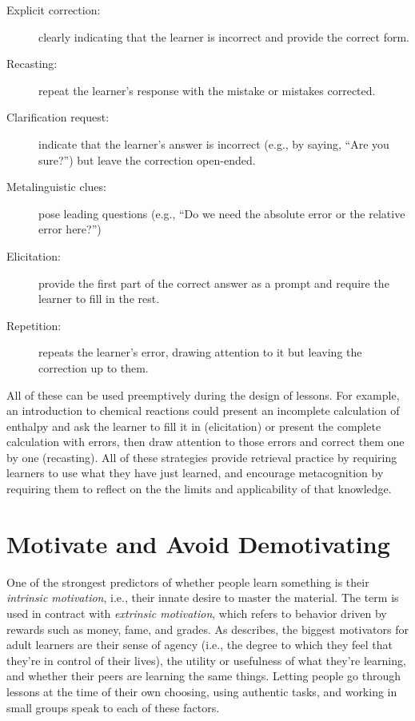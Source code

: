 \documentclass[10pt,letterpaper]{article}
\newcommand{\rulemajor}[1]{\section{#1}}
\begin{document}
\begin{description}

\item[Explicit correction:] clearly indicating that the learner is incorrect and
  provide the correct form.

\item[Recasting:] repeat the learner's response with the mistake or mistakes
  corrected.

\item[Clarification request:] indicate that the learner's answer is incorrect
  (e.g., by saying, ``Are you sure?'') but leave the correction open-ended.

\item[Metalinguistic clues:] pose leading questions (e.g., ``Do we need the
  absolute error or the relative error here?'')

\item[Elicitation:] provide the first part of the correct answer as a prompt and
  require the learner to fill in the rest.

\item[Repetition:] repeats the learner's error, drawing attention to it but
  leaving the correction up to them.

\end{description}

All of these can be used preemptively during the design of lessons.  For
example, an introduction to chemical reactions could present an incomplete
calculation of enthalpy and ask the learner to fill it in (elicitation) or
present the complete calculation with errors, then draw attention to those
errors and correct them one by one (recasting).  All of these strategies provide
retrieval practice by requiring learners to use what they have just learned, and
encourage metacognition by requiring them to reflect on the the limits and
applicability of that knowledge.

\rulemajor{Motivate and Avoid Demotivating}

One of the strongest predictors of whether people learn something is their
\emph{intrinsic motivation}, i.e., their innate desire to master the material.
The term is used in contract with \emph{extrinsic motivation}, which refers to
behavior driven by rewards such as money, fame, and grades.  As \cite{Wlod2017}
describes, the biggest motivators for adult learners are their sense of agency
(i.e., the degree to which they feel that they're in control of their lives),
the utility or usefulness of what they're learning, and whether their peers are
learning the same things.  Letting people go through lessons at the time of
their own choosing, using authentic tasks, and working in small groups speak to
each of these factors.
\end{document}
